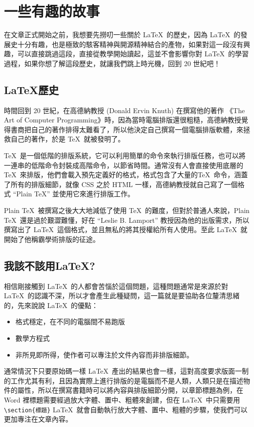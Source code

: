 \chapter{一些有趣的故事}

在文章正式開始之前，我想要先撈叨一些關於 \LaTeX\ 的歷史，因為 \LaTeX\ 的發展史十分有趣，也是極致的駭客精神與開源精神結合的產物，如果對這一段沒有興趣，可以直接跳過這段，直接從教學開始讀起，這並不會影響你對 \LaTeX\ 的學習過程，如果你想了解這段歷史，就讓我們跳上時光機，回到 20 世紀吧！

\section{\LaTeX 歷史}

時間回到 20 世紀，在高德納教授 (Donald Ervin Knuth) 在撰寫他的著作 《The Art of Computer Programming》時，因為當時電腦排版還很粗糙，高德納教授覺得書商把自己的著作排得太難看了，所以他決定自己撰寫一個電腦排版軟體，來拯救自己的著作，於是 \TeX\ 就被發明了。

\TeX\ 是一個低階的排版系統，它可以利用簡單的命令來執行排版任務，也可以將一連串的低階命令封裝成高階命令，以節省時間。通常沒有人會直接使用底層的 \TeX\ 來排版，他們會載入預先定義好的格式，格式包含了大量的\TeX\ 命令，涵蓋了所有的排版細節，就像 CSS 之於 HTML 一樣，高德納教授就自己寫了一個格式 ``Plain \TeX '' 並使用它來進行排版工作。

Plain \TeX\ 被撰寫之後大大地減低了使用 \TeX\ 的難度，但對於普通人來說，Plain \TeX\ 還是過於艱澀難懂，好在 ``Leslie B. Lamport'' 教授因為他的出版需求，所以撰寫出了 \LaTeX\ 這個格式，並且無私的將其授權給所有人使用。至此 \LaTeX\ 就開始了他稱霸學術排版的征途。

\section{我該不該用\LaTeX ?}

相信剛接觸到 \LaTeX\ 的人都會苦惱於這個問題，這種問題通常是來源於對 \LaTeX\ 的認識不深，所以才會產生此種疑問，這一篇就是要協助各位釐清思緒的，先來說說 \LaTeX\ 的優點：

\begin{itemize}
\item 格式穩定，在不同的電腦間不易跑版
\item 數學方程式
\item 非所見即所得，使作者可以專注於文件內容而非排版細節。
\end{itemize}
\pskip
通常情況下只要原始碼一樣 \LaTeX\ 產出的結果也會一樣，這對高度要求版面一制的工作尤其有利，且因為實際上進行排版的是電腦而不是人類，人類只是在描述物件的屬性，所以在撰寫書籍時可以將內容與排版細節分開，以章節標題為例，在 Word 裡標題需要經過放大字體、置中、粗體來創建，但在 \LaTeX\ 中只需要用 \verb|\section{標題}|  \LaTeX\ 就會自動執行放大字體、置中、粗體的步驟，使我們可以更加專注在文章內容。


